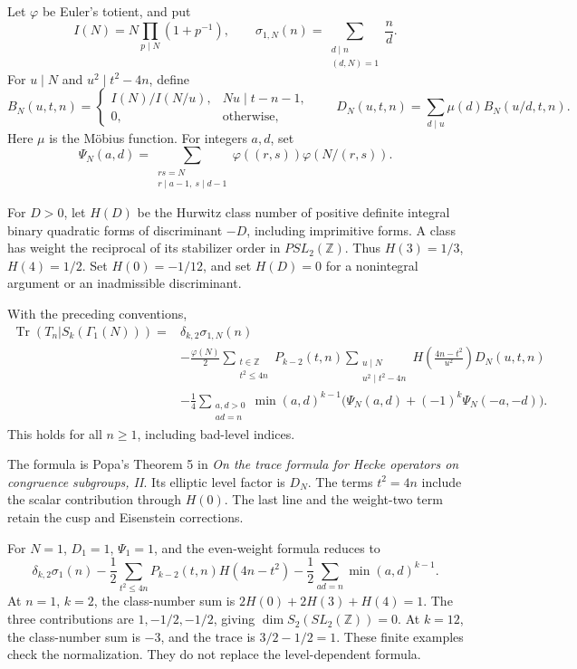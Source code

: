 Let $\varphi$ be Euler's totient, and put
\[
 I(N)=N\prod_{p\mid N}(1+p^{-1}),\qquad
 \sigma_{1,N}(n)=
     \sum_{\substack{d\mid n\\(d,N)=1}}\frac nd.
\]
For $u\mid N$ and $u^2\mid t^2-4n$, define
\[
 B_N(u,t,n)=
  \begin{cases}
    I(N)/I(N/u),&Nu\mid t-n-1,\\
    0,&\text{otherwise},
  \end{cases}
 \qquad
 D_N(u,t,n)=\sum_{d\mid u}\mu(d)B_N(u/d,t,n).
\]
Here $\mu$ is the M\"obius function. For integers $a,d$, set
\[
 \Psi_N(a,d)=
 \sum_{\substack{rs=N\\r\mid a-1,\ s\mid d-1}}
       \varphi((r,s))\varphi(N/(r,s)).
\]

For $D>0$, let $H(D)$ be the Hurwitz class number of positive definite
integral binary quadratic forms of discriminant $-D$, including imprimitive
forms. A class has weight the reciprocal of its stabilizer order in
$PSL_2(\mathbb Z)$. Thus $H(3)=1/3$, $H(4)=1/2$. Set $H(0)=-1/12$, and set
$H(D)=0$ for a nonintegral argument or an inadmissible discriminant.

\begin{theorem}
\label{v4-arith:traces:hecke-level}
With the preceding conventions,
\begin{align*}
 \operatorname{Tr}(T_n|S_k(\Gamma_1(N)))
  ={}&\delta_{k,2}\sigma_{1,N}(n)\\
 &-\frac{\varphi(N)}2
   \sum_{\substack{t\in\mathbb Z\\t^2\leq4n}}
     P_{k-2}(t,n)
     \sum_{\substack{u\mid N\\u^2\mid t^2-4n}}
       H\left(\frac{4n-t^2}{u^2}\right)D_N(u,t,n)\\
 &-\frac14\sum_{\substack{a,d>0\\ad=n}}
      \min(a,d)^{k-1}
       \bigl(\Psi_N(a,d)+(-1)^k\Psi_N(-a,-d)\bigr).
\end{align*}
This holds for all $n\geq1$, including bad-level indices.
\end{theorem}

The formula is Popa's Theorem 5 in \emph{On the trace formula for Hecke
operators on congruence subgroups, II}. Its elliptic level factor is $D_N$.
The terms $t^2=4n$ include the scalar contribution through $H(0)$. The last
line and the weight-two term retain the cusp and Eisenstein corrections.

For $N=1$, $D_1=1$, $\Psi_1=1$, and the even-weight formula reduces to
\[
 \delta_{k,2}\sigma_1(n)
 -\frac12\sum_{t^2\leq4n}
                P_{k-2}(t,n)H(4n-t^2)
 -\frac12\sum_{ad=n}\min(a,d)^{k-1}.
\]
At $n=1$, $k=2$, the class-number sum is $2H(0)+2H(3)+H(4)=1$. The three
contributions are $1,-1/2,-1/2$, giving $\dim S_2(SL_2(\mathbb Z))=0$. At
$k=12$, the class-number sum is $-3$, and the trace is $3/2-1/2=1$. These
finite examples check the normalization. They do not replace the
level-dependent formula.

